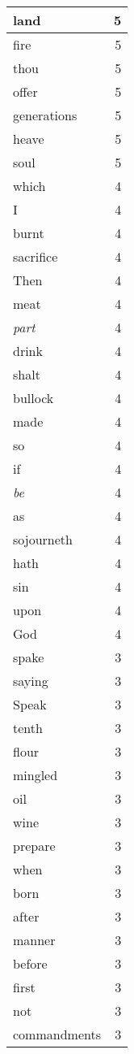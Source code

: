 \begin{center}
\begin{longtable}{l|r}
land & 5 \\ \hline
fire & 5 \\ \hline
thou & 5 \\ \hline
offer & 5 \\ \hline
generations & 5 \\ \hline
heave & 5 \\ \hline
soul & 5 \\ \hline
which & 4 \\ \hline
I & 4 \\ \hline
burnt & 4 \\ \hline
sacrifice & 4 \\ \hline
Then & 4 \\ \hline
meat & 4 \\ \hline
\emph{part} & 4 \\ \hline
drink & 4 \\ \hline
shalt & 4 \\ \hline
bullock & 4 \\ \hline
made & 4 \\ \hline
so & 4 \\ \hline
if & 4 \\ \hline
\emph{be} & 4 \\ \hline
as & 4 \\ \hline
sojourneth & 4 \\ \hline
hath & 4 \\ \hline
sin & 4 \\ \hline
upon & 4 \\ \hline
God & 4 \\ \hline
spake & 3 \\ \hline
saying & 3 \\ \hline
Speak & 3 \\ \hline
tenth & 3 \\ \hline
flour & 3 \\ \hline
mingled & 3 \\ \hline
oil & 3 \\ \hline
wine & 3 \\ \hline
prepare & 3 \\ \hline
when & 3 \\ \hline
born & 3 \\ \hline
after & 3 \\ \hline
manner & 3 \\ \hline
before & 3 \\ \hline
first & 3 \\ \hline
not & 3 \\ \hline
commandments & 3 \\ \hline

\end{longtable}
\end{center}
